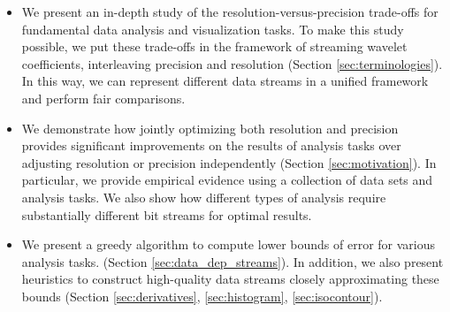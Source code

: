 \begin{itemize}
\item We present an in-depth study of the resolution-versus-precision trade-offs for fundamental
  data analysis and visualization tasks. To make this study possible, we put these trade-offs in the
  framework of streaming wavelet coefficients, interleaving precision and resolution (Section
  \ref{sec:terminologies}). In this way, we can represent different data streams in a unified
  framework and perform fair comparisons.
   
\item We demonstrate how jointly optimizing both resolution and precision provides significant
  improvements on the results of analysis tasks over adjusting resolution or precision independently
  (Section \ref{sec:motivation}). In particular, we provide empirical evidence using a collection of
  data sets and analysis tasks. We also show how different types of analysis require substantially
  different bit streams for optimal results.

\item We present a greedy algorithm to compute lower bounds of error for various analysis tasks.
  (Section \ref{sec:data_dep_streams}). In addition, we also present heuristics to construct
  high-quality data streams closely approximating these bounds (Section \ref{sec:derivatives}, \ref{sec:histogram}, \ref{sec:isocontour}).
\end{itemize}

